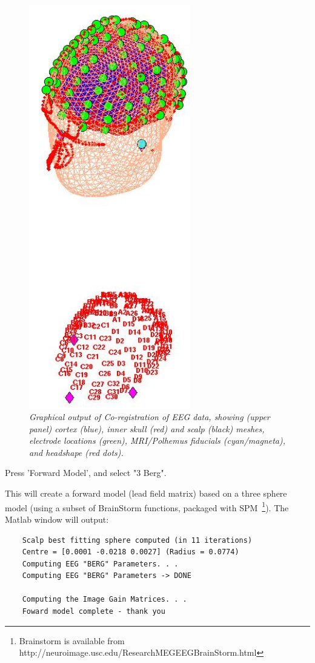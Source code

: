 \begin{figure}
\begin{center}
\includegraphics[width=70mm]{multimodal/figures/figure_32_8}
\caption{\em  Graphical output of Co-registration of EEG data, showing (upper panel) cortex (blue), inner skull (red) and scalp (black) meshes, electrode locations (green), MRI/Polhemus fiducials (cyan/magneta), and headshape (red dots).\label{fig_32_8}}
\end{center}
\end{figure}

\noindent * Press 'Forward Model', and select "3 {Berg}".

This will create a forward model (lead field matrix) based on a three sphere model (using a subset of BrainStorm functions, packaged with SPM~\footnote{Brainstorm is available from http://neuroimage.usc.edu/ResearchMEGEEGBrainStorm.html}). The Matlab window will output:
\begin{verbatim}
    Scalp best fitting sphere computed (in 11 iterations)
    Centre = [0.0001 -0.0218 0.0027] (Radius = 0.0774)
    Computing EEG "BERG" Parameters. . .
    Computing EEG "BERG" Parameters -> DONE

    Computing the Image Gain Matrices. . .
    Foward model complete - thank you
 \end{verbatim}

